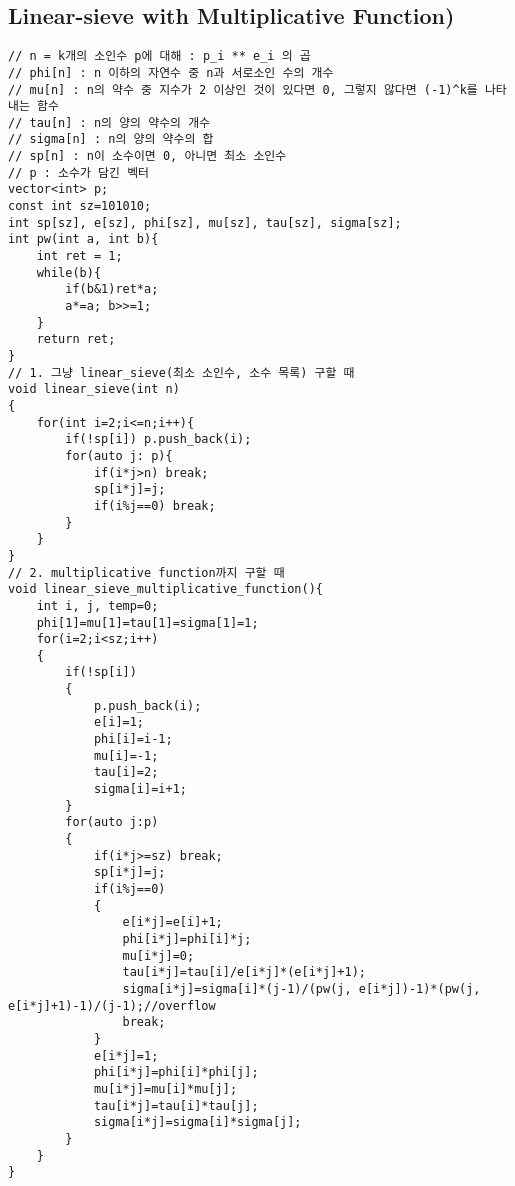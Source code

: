 \documentclass[landscape, 8pt, a4paper, oneside, twocolumn]{extarticle}
\begin{document}
\subsection{Linear-sieve with Multiplicative Function)}
\begin{verbatim}
// n = k개의 소인수 p에 대해 : p_i ** e_i 의 곱
// phi[n] : n 이하의 자연수 중 n과 서로소인 수의 개수
// mu[n] : n의 약수 중 지수가 2 이상인 것이 있다면 0, 그렇지 않다면 (-1)^k를 나타내는 함수
// tau[n] : n의 양의 약수의 개수
// sigma[n] : n의 양의 약수의 합
// sp[n] : n이 소수이면 0, 아니면 최소 소인수
// p : 소수가 담긴 벡터
vector<int> p;
const int sz=101010;
int sp[sz], e[sz], phi[sz], mu[sz], tau[sz], sigma[sz];
int pw(int a, int b){
    int ret = 1;
    while(b){
        if(b&1)ret*a; 
        a*=a; b>>=1;
    }
    return ret;
}
// 1. 그냥 linear_sieve(최소 소인수, 소수 목록) 구할 때
void linear_sieve(int n)
{
	for(int i=2;i<=n;i++){
		if(!sp[i]) p.push_back(i);
		for(auto j: p){
			if(i*j>n) break;
			sp[i*j]=j;
			if(i%j==0) break;
		}
	}
}
// 2. multiplicative function까지 구할 때 
void linear_sieve_multiplicative_function(){
    int i, j, temp=0;
	phi[1]=mu[1]=tau[1]=sigma[1]=1;
	for(i=2;i<sz;i++)
	{
		if(!sp[i])
		{
			p.push_back(i);
			e[i]=1;
			phi[i]=i-1;
			mu[i]=-1;
			tau[i]=2;
			sigma[i]=i+1;
		}
		for(auto j:p)
		{
			if(i*j>=sz) break;
			sp[i*j]=j;
			if(i%j==0)
			{
				e[i*j]=e[i]+1;
				phi[i*j]=phi[i]*j;
				mu[i*j]=0;
				tau[i*j]=tau[i]/e[i*j]*(e[i*j]+1);
				sigma[i*j]=sigma[i]*(j-1)/(pw(j, e[i*j])-1)*(pw(j, e[i*j]+1)-1)/(j-1);//overflow
				break;
			}
			e[i*j]=1;
			phi[i*j]=phi[i]*phi[j];
			mu[i*j]=mu[i]*mu[j];
			tau[i*j]=tau[i]*tau[j];
			sigma[i*j]=sigma[i]*sigma[j];
		}
	}
}
\end{verbatim}
\end{document}
